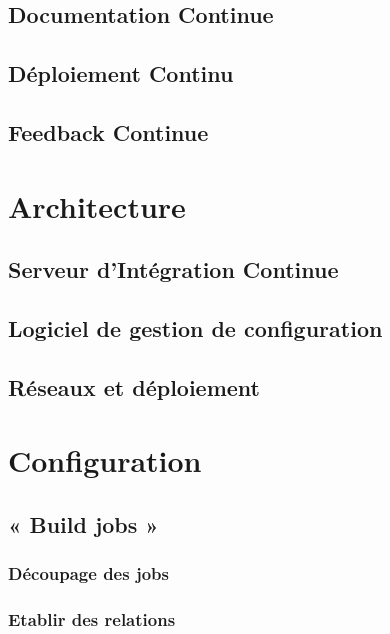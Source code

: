 \documentclass{report}
\begin{document}
        \subsection{Documentation Continue}

        \subsection{Déploiement Continu}

        \subsection{Feedback Continue}

      \section{Architecture}

        \subsection{Serveur d’Intégration Continue}

        \subsection{Logiciel de gestion de configuration}

        \subsection{Réseaux et déploiement}

      \section{Configuration}

        \subsection{« Build jobs »}

          \subsubsection{Découpage des jobs}

          \subsubsection{Etablir des relations}
\end{document}
